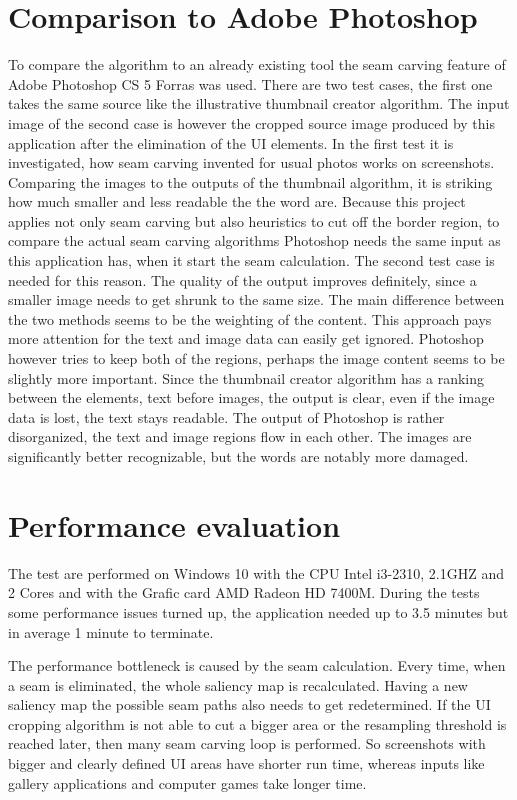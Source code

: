 \documentclass[draft,final]{vutinfth} %
\begin{document}
\section{Comparison to Adobe Photoshop} 
To compare the algorithm to an already existing tool the seam carving feature of Adobe Photoshop CS 5 Forras was used.
There are two test cases, the first one takes the same source like the illustrative thumbnail creator algorithm.
The input image of the second case is however the cropped source image produced by this application after the elimination of the UI elements.
In the first test it is investigated, how seam carving invented for usual photos works on screenshots.
Comparing the images to the outputs of the thumbnail algorithm, it is striking how much smaller and less readable the the word are.
Because this project applies not only seam carving but also heuristics to cut off the border region, to compare the actual seam carving algorithms Photoshop needs the same input as this application has, when it start the seam calculation.
The second test case is needed for this reason.
The quality of the output improves definitely, since a smaller image needs to get shrunk to the same size.
The main difference between the two methods seems to be the weighting of the content.
This approach pays more attention for the text and image data can easily get ignored.
Photoshop however tries to keep both of the regions, perhaps the image content seems to be slightly more important.
Since the thumbnail creator algorithm has a ranking between the elements, text before images, the output is clear, even if the image data is lost, the text stays readable.
The output of Photoshop is rather disorganized, the text and image regions flow in each other.
The images are significantly better recognizable, but the words are notably more damaged.  
  
\section{Performance evaluation}
The test are performed on Windows 10 with the CPU Intel i3-2310, 2.1GHZ and 2 Cores and with the Grafic card AMD Radeon HD 7400M.
During the tests some performance issues turned up, the application needed up to 3.5 minutes but in average 1 minute  to terminate.\par 
The performance bottleneck is caused by the seam calculation.
Every time, when a seam is eliminated, the whole saliency map is recalculated.
Having a new saliency map the possible seam paths also needs to get redetermined.
If the UI cropping algorithm is not able to cut a bigger area or the resampling threshold is reached later, then many seam carving loop is performed. 
So screenshots with bigger and clearly defined UI areas have shorter run time, whereas inputs like gallery applications and computer games take longer time. 
\end{document}
